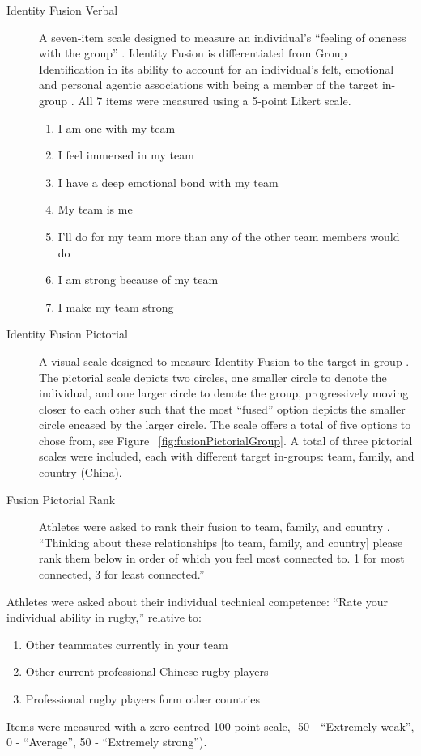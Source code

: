 \begin{CJK}{UTF8}{gbsn}
\begin{description}
  \item [Identity Fusion Verbal] A seven-item scale designed to measure an individual's ``feeling of oneness with the group'' \citep{Swann2009}.  Identity Fusion is differentiated from Group Identification in its ability to account for an individual's felt, emotional and personal agentic associations with being a member of the target in-group \citep{Swann2012a}.  All 7 items were measured using a 5-point Likert scale.
    \begin{enumerate}
      \item I am one with my team
      \item I feel immersed in my team
      \item I have a deep emotional bond with my team
      \item My team is me
      \item I’ll do for my team more than any of the other team members would do
      \item I am strong because of my team
      \item I make my team strong
    \end{enumerate}
  \item [Identity Fusion Pictorial] A visual scale designed to measure Identity Fusion to the target in-group \citep{Swann2009}. The pictorial scale depicts two circles, one smaller circle to denote the individual, and one larger circle to denote the group, progressively moving closer to each other such that the most ``fused'' option depicts the smaller circle encased by the larger circle. The scale offers a total of five options to chose from, see Figure ~\ref{fig:fusionPictorialGroup}.  A total of three pictorial scales were included, each with different target in-groups: team, family, and country (China).
  \item [Fusion Pictorial Rank] Athletes were asked to rank their fusion to team, family, and country \citep{Whitehouse2014}.  ``Thinking about these relationships [to team, family, and country] please rank them below in order of which you feel most connected to. 1 for most connected, 3 for least connected.''
  \end{description}


Athletes were asked about their individual technical competence: ``Rate your individual ability in rugby,'' relative to:
\begin{enumerate}
  \item Other teammates currently in your team
  \item Other current professional Chinese rugby players
  \item Professional rugby players form other countries
\end{enumerate}
Items were measured with a zero-centred 100 point scale, -50 - ``Extremely weak'', 0 - ``Average'', 50 - ``Extremely strong'').


\end{CJK}
